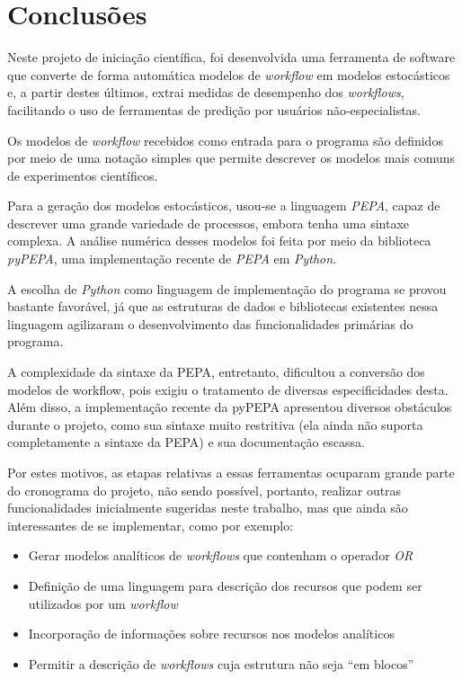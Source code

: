 \documentclass[a4paper,11pt]{article}
\begin{document}
    \section*{Conclusões}

        Neste projeto de iniciação científica, foi desenvolvida uma ferramenta de software que converte de forma automática modelos de \emph{workflow} em modelos estocásticos e, a partir destes últimos, extrai medidas de desempenho dos \emph{workflows}, facilitando o uso de ferramentas de predição por usuários não-especialistas.

        Os modelos de \emph{workflow} recebidos como entrada para o programa são definidos por meio de uma notação simples que permite descrever os modelos mais comuns de experimentos científicos.

        Para a geração dos modelos estocásticos, usou-se a linguagem \emph{PEPA}, capaz de descrever uma grande variedade de processos, embora tenha uma sintaxe complexa. A análise numérica desses modelos foi feita por meio da biblioteca \emph{pyPEPA}, uma implementação recente de \emph{PEPA} em \emph{Python}.

        A escolha de \emph{Python} como linguagem de implementação do programa se provou bastante favorável, já que as estruturas de dados e bibliotecas existentes nessa linguagem agilizaram o desenvolvimento das funcionalidades primárias do programa.

        A complexidade da sintaxe da PEPA, entretanto, dificultou a conversão dos modelos de workflow, pois exigiu o tratamento de diversas especificidades desta. Além disso, a implementação recente da pyPEPA apresentou diversos obstáculos durante o projeto, como sua sintaxe muito restritiva (ela ainda não suporta completamente a sintaxe da PEPA) e sua documentação escassa.

        Por estes motivos, as etapas relativas a essas ferramentas ocuparam grande parte do cronograma do projeto, não sendo possível, portanto, realizar outras funcionalidades inicialmente sugeridas neste trabalho, mas que ainda são interessantes de se implementar, como por exemplo:
        \begin{itemize}
            \item Gerar modelos analíticos de \emph{workflows} que contenham o operador \emph{OR}
            \item Definição de uma linguagem para descrição dos recursos que podem ser utilizados por um \emph{workflow}
            \item Incorporação de informações sobre recursos nos modelos analíticos
            \item Permitir a descrição de \emph{workflows} cuja estrutura não seja ``em blocos''
        \end{itemize}

    
    
\end{document}
